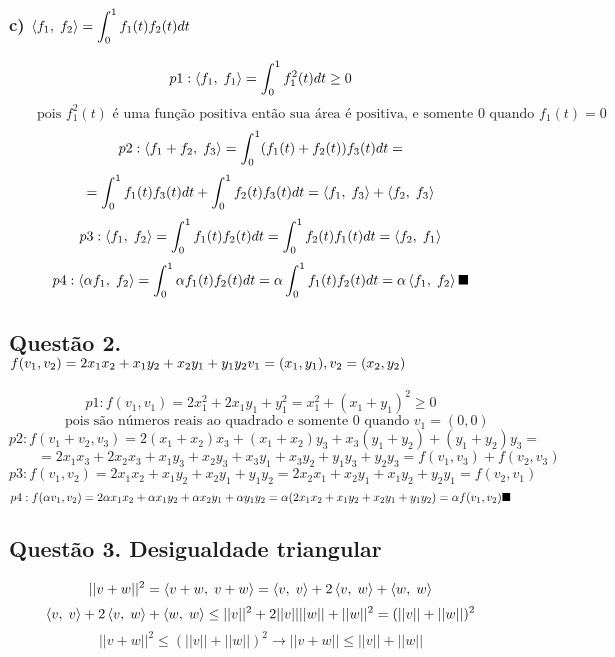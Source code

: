 \documentclass[12pt]{article}
\begin{document}
\subsubsection{c) $\left\langle f_{1},\;f_{2}\right\rangle = \displaystyle \int_{0}^{1} f_{1}(t)f_{2}(t) dt$}

\[p1: \left\langle f_{1},\;f_{1}\right\rangle = \int_{0}^{1} f_{1}^{2}(t) dt \geq 0\]
\[\qquad \text{pois } f_{1}^{2}(t) \text{ é uma função positiva então sua área é positiva, e somente } 0 \text{ quando } f_{1}(t) = 0\]
\[p2: \left\langle f_{1}+f_{2},\;f_{3}\right\rangle = \int_{0}^{1} (f_{1}(t)+f_{2}(t))f_{3}(t) dt =\]
\[= \int_{0}^{1} f_{1}(t)f_{3}(t) dt + \int_{0}^{1} f_{2}(t)f_{3}(t) dt = \left\langle f_{1},\;f_{3}\right\rangle + \left\langle f_{2},\;f_{3}\right\rangle\]
\[p3: \left\langle f_{1},\;f_{2}\right\rangle = \int_{0}^{1} f_{1}(t)f_{2}(t) dt = \int_{0}^{1} f_{2}(t)f_{1}(t) dt = \left\langle f_{2},\;f_{1}\right\rangle\]
\[p4: \p{\alpha f_{1}}{f_{2}} = \int_{0}^{1} \alpha f_{1}(t)f_{2}(t) dt = \alpha \int_{0}^{1} f_{1}(t)f_{2}(t) dt = \alpha \p{f_{1}}{f_{2}} \hfill \blacksquare\]

\subsection{Questão 2. $f(v_{1},v_{2}) = 2x_{1}x_{2}+x_{1}y_{2}+x_{2}y_{1}+y_{1}y_{2} \hfill v_{1}=(x_{1},y_{1}), v_{2} = (x_{2},y_{2})$}

\[p1: f(v_{1},v_{1}) = 2x_{1}^{2}+2x_{1}y_{1}+y_{1}^{2} = x_{1}^{2} + (x_{1}+y_{1})^{2} \geq 0\]
\[\qquad \text{ pois são números reais ao quadrado e somente } 0 \text{ quando } v_{1} = (0,0)\]
\[p2: f(v_{1}+v_{2},v_{3}) = 2(x_{1}+x_{2})x_{3} + (x_{1}+x_{2})y_{3} + x_{3}(y_{1}+y_{2}) + (y_{1}+y_{2})y_{3} =\]
\[\qquad = 2x_{1}x_{3}+2x_{2}x_{3} + x_{1}y_{3}+x_{2}y_{3} + x_{3}y_{1}+x_{3}y_{2} + y_{1}y_{3}+y_{2}y_{3} = f(v_{1},v_{3}) + f(v_{2},v_{3})\]
\[p3: f(v_{1},v_{2}) = 2x_{1}x_{2} + x_{1}y_{2} + x_{2}y_{1} + y_{1}y_{2} = 2x_{2}x_{1} + x_{2}y_{1} + x_{1}y_{2} + y_{2}y_{1} = f(v_{2},v_{1})\]
\[p4: f(\alpha v_{1},v_{2}) = 2\alpha x_{1}x_{2} + \alpha x_{1}y_{2} + \alpha x_{2}y_{1} + \alpha y_{1}y_{2} = \alpha(2x_{1}x_{2} + x_{1}y_{2} + x_{2}y_{1} + y_{1}y_{2}) = \alpha f(v_{1},v_{2}) \hfill \blacksquare\]

\subsection{Questão 3. Desigualdade triangular}

\[||v+w||^{2} = \left\langle v+w,\;v+w\right\rangle = \left\langle v,\;v\right\rangle + 2\left\langle v,\;w\right\rangle + \left\langle w,\;w\right\rangle\]
\[\left\langle v,\;v\right\rangle + 2\left\langle v,\;w\right\rangle + \left\langle w,\;w\right\rangle \leq ||v||^{2}+2||v||||w||+||w||^{2} = (||v||+||w||)^{2}\]
\[||v+w||^{2} \leq (||v||+||w||)^{2} \longrightarrow ||v+w|| \leq ||v||+||w||\]
\end{document}
